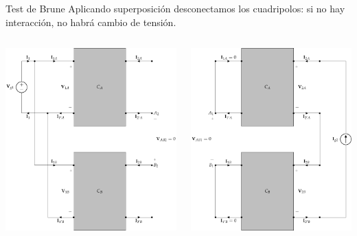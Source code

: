 \documentclass[xcolor={usenames,svgnames,dvipsnames}]{beamer}
\begin{document}
\begin{frame}[label={sec:org75273b2},plain]{Test de Brune}
Aplicando superposición desconectamos los cuadripolos: \alert{si no hay interacción, no habrá cambio de tensión}.
\begin{columns}
\begin{column}{0.65\columnwidth}
\begin{center}
\includegraphics[width=.9\linewidth]{../figs/paralelo-serie-brune-entrada.pdf}
\end{center}
\end{column}
\begin{column}{0.65\columnwidth}
\begin{center}
\includegraphics[width=.9\linewidth]{../figs/paralelo-serie-brune-salida.pdf}

\end{center}
\end{column}
\end{columns}
\end{frame}
\end{document}
